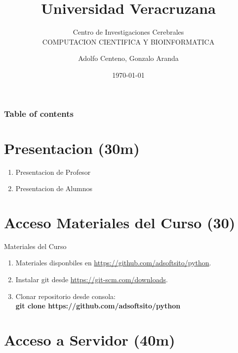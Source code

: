 \documentclass{beamer}
\begin{document}
\title{Universidad Veracruzana}  
\subtitle{Centro de Investigaciones Cerebrales\\COMPUTACION CIENTIFICA Y BIOINFORMATICA}
\author{Adolfo Centeno, Gonzalo Aranda}
\date{\today} 

\begin{frame}
\titlepage
\end{frame}

\begin{frame}\frametitle{Table of contents}
\tableofcontents
\end{frame} 


\section{Presentacion (30m) }

\begin{frame} 

\begin{enumerate}
\item
 Presentacion de Profesor
\item
 Presentacion de Alumnos
\end{enumerate} 


\end{frame}


\section{Acceso Materiales del Curso (30) }

\begin{frame}

Materiales del Curso

\begin{enumerate}
\item
	Materiales disponbiles en \href{https://github.com/adsoftsito/python}{https://github.com/adsoftsito/python}.
\item
    Instalar git desde \href{https://git-scm.com/downloads}{https://git-scm.com/downloads}.
\item
	Clonar repositorio desde consola: \\ 
 	\textbf{git clone https://github.com/adsoftsito/python}
	

\end{enumerate} 

\end{frame}


\section{Acceso a Servidor (40m) }
\end{document}
